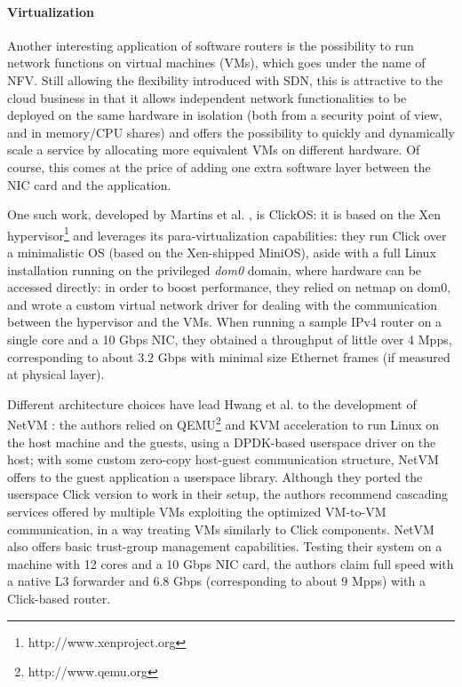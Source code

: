 \documentclass[11pt,a4paper,twoside,titlepage,openany]{book}
\begin{document}
\paragraph{Virtualization} Another interesting application of software routers is the possibility to run network functions on virtual machines (VMs), which goes under the name of \acrfull{NFV}.
Still allowing the flexibility introduced with \gls{SDN}, this is attractive to the cloud business in that it allows independent network functionalities to be deployed on the same hardware in isolation (both from a security point of view, and in memory/CPU shares) and offers the possibility to quickly and dynamically scale a service by allocating more equivalent VMs on different hardware. Of course, this comes at the price of adding one extra software layer between the NIC card and the application.

One such work, developed by Martins et al. \cite{clickos}, is ClickOS: it is based on the Xen hypervisor\footnote{http://www.xenproject.org} and leverages its para-virtualization capabilities: they run Click over a minimalistic OS (based on the Xen-shipped MiniOS), aside with a full Linux installation running on the privileged \emph{dom0} domain, where hardware can be accessed directly: in order to boost performance, they relied on netmap \cite{netmap} on dom0, and wrote a custom virtual network driver for dealing with the communication between the hypervisor and the VMs. When running a sample IPv4 router on a single core and a 10 Gbps NIC, they obtained a throughput of little over 4 Mpps, corresponding to about $3.2$ Gbps with minimal size Ethernet frames (if measured at physical layer).

Different architecture choices have lead Hwang et al. to the development of NetVM \cite{netvm}: the authors relied on QEMU\footnote{http://www.qemu.org} and KVM acceleration to run Linux on the host machine and the guests, using a DPDK-based userspace driver on the host; with some custom zero-copy host-guest communication structure, NetVM offers to the guest application a userspace library. Although they ported the userspace Click version to work in their setup, the authors recommend cascading services offered by multiple VMs exploiting the optimized VM-to-VM communication, in a way treating VMs similarly to Click components. NetVM also offers basic trust-group management capabilities. Testing their system on a machine with 12 cores and a 10 Gbps NIC card, the authors claim full speed with a native L3 forwarder and 6.8 Gbps (corresponding to about 9 \gls{Mpps}) with a Click-based router.
\end{document}

